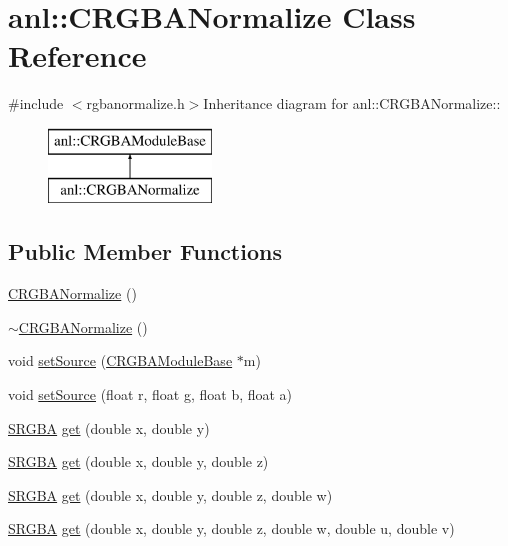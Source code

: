 \hypertarget{classanl_1_1CRGBANormalize}{
\section{anl::CRGBANormalize Class Reference}
\label{classanl_1_1CRGBANormalize}
}


{\ttfamily \#include $<$rgbanormalize.h$>$}Inheritance diagram for anl::CRGBANormalize::\begin{figure}[H]
\begin{center}
\leavevmode
\includegraphics[height=2cm]{classanl_1_1CRGBANormalize}
\end{center}
\end{figure}
\subsection*{Public Member Functions}
\begin{DoxyCompactItemize}
\item 
\hyperlink{classanl_1_1CRGBANormalize_af4c3b40f005c0ec0e718cb3485da6cd3}{CRGBANormalize} ()
\item 
\hyperlink{classanl_1_1CRGBANormalize_acafae03851103b3b875708a015b533e0}{$\sim$CRGBANormalize} ()
\item 
void \hyperlink{classanl_1_1CRGBANormalize_aa6de1b704947b49c2351c7a95b9776ba}{setSource} (\hyperlink{classanl_1_1CRGBAModuleBase}{CRGBAModuleBase} $\ast$m)
\item 
void \hyperlink{classanl_1_1CRGBANormalize_a472266f845cd7da7a10860e10591c641}{setSource} (float r, float g, float b, float a)
\item 
\hyperlink{structanl_1_1SRGBA}{SRGBA} \hyperlink{classanl_1_1CRGBANormalize_a02fcc5f3c5df6750712c28afa66a6ccd}{get} (double x, double y)
\item 
\hyperlink{structanl_1_1SRGBA}{SRGBA} \hyperlink{classanl_1_1CRGBANormalize_aaa04a3a2cb2ce5fd15e574731ac6f183}{get} (double x, double y, double z)
\item 
\hyperlink{structanl_1_1SRGBA}{SRGBA} \hyperlink{classanl_1_1CRGBANormalize_a42a91db8a13d2b771f81ed1a55ee9eff}{get} (double x, double y, double z, double w)
\item 
\hyperlink{structanl_1_1SRGBA}{SRGBA} \hyperlink{classanl_1_1CRGBANormalize_a3cf10a459e0340cd687676580b42383d}{get} (double x, double y, double z, double w, double u, double v)
\end{DoxyCompactItemize}
